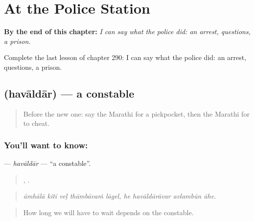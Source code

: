 
\chapter{At the Police Station}
\label{ch:mr-at-the-police-station}

\begin{chapteropening}
\textbf{By the end of this chapter:} \emph{I can say what the police did: an arrest, questions, a prison.}

Complete the last lesson of chapter 290: I can say what the police did: an arrest, questions, a prison.
\end{chapteropening}

\section[\texorpdfstring{\mr{हवालदार} (havāldār)}{हवालदार (havāldār)}]{ (havāldār) — a constable}

\label{lesson:MR-C290-havaldar}



\begin{quote}
Before the new one: say the Marathi for a pickpocket, then the Marathi for to cheat.
\end{quote}

\subsection*{You'll want to know: }
\textbf{} — \emph{havāldār} — \textquotedblleft{}a constable\textquotedblright{}.

\begin{quote}
    ,    .
\end{quote}

\begin{quote}
\emph{āmhālā kitī veḷ thāmbāvaṁ lāgel, he havāldārāvar avlambūn āhe.}
\end{quote}

\begin{quote}
How long we will have to wait depends on the constable.
\end{quote}

